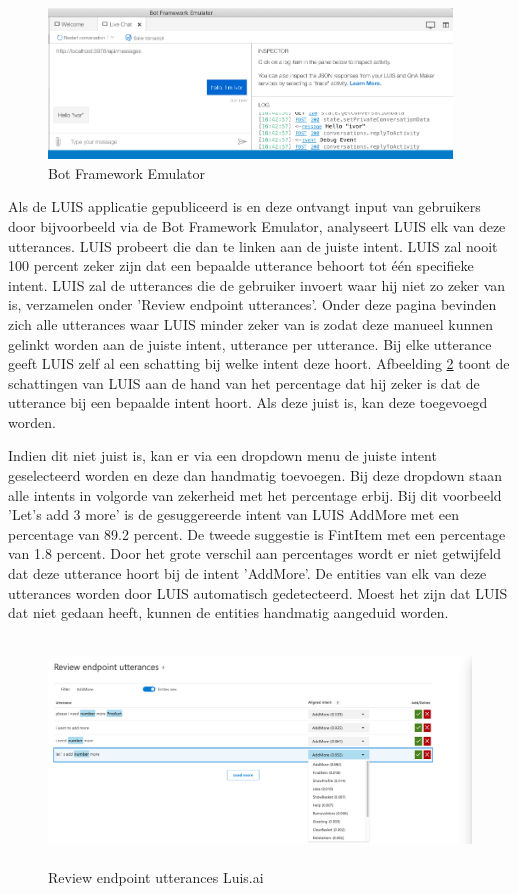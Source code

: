 \begin{figure}[h!]
	\centering
	\includegraphics[height=4cm]{img/emulator.png}
	\caption{Bot Framework Emulator}
	\label{fig:emulator}
\end{figure}

Als de LUIS applicatie gepubliceerd is en deze ontvangt input van gebruikers door bijvoorbeeld via de Bot Framework Emulator, analyseert LUIS elk van deze utterances. LUIS probeert die dan te linken aan de juiste intent. LUIS zal nooit 100 percent zeker zijn dat een bepaalde utterance behoort tot één specifieke intent. LUIS zal de utterances die de gebruiker invoert waar hij niet zo zeker van is, verzamelen onder 'Review endpoint utterances'. Onder deze pagina bevinden zich alle utterances waar LUIS minder zeker van is zodat deze manueel kunnen gelinkt worden aan de juiste intent, utterance per utterance. Bij elke utterance geeft LUIS zelf al een schatting bij welke intent deze hoort. Afbeelding \ref{fig:review} toont de schattingen van LUIS aan de hand van het percentage dat hij zeker is dat de utterance bij een bepaalde intent hoort. Als deze juist is, kan deze toegevoegd worden. 

Indien dit niet juist is, kan er via een dropdown menu de juiste intent geselecteerd worden en deze dan handmatig toevoegen. Bij deze dropdown staan alle intents in volgorde van zekerheid met het percentage erbij. Bij dit voorbeeld 'Let's add 3 more' is de gesuggereerde intent van LUIS AddMore met een percentage van 89.2 percent. De tweede suggestie is FintItem met een percentage van 1.8 percent. Door het grote verschil aan percentages wordt er niet getwijfeld dat deze utterance hoort bij de intent 'AddMore'. De entities van elk van deze utterances worden door LUIS automatisch gedetecteerd. Moest het zijn dat LUIS dat niet gedaan heeft, kunnen de entities handmatig aangeduid worden.

\begin{figure}[h!]
	\centering
	\includegraphics[height=6cm]{img/review.png}
	\caption{Review endpoint utterances Luis.ai}
	\label{fig:review}
\end{figure}

